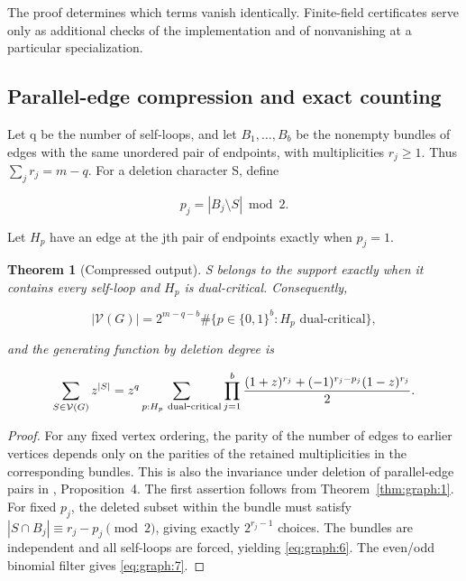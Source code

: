 \documentclass[11pt,a4paper,oneside]{article}
\theoremstyle{plain}
\newtheorem{theorem}{Theorem}[section]
\theoremstyle{definition}
\theoremstyle{remark}
\numberwithin{equation}{section}
\begin{document}
The proof determines which terms vanish identically. Finite-field certificates serve only as additional checks of the implementation and of nonvanishing at a particular specialization.


\subsection{Parallel-edge compression and exact counting}\label{sec:graph:3}

Let q be the number of self-loops, and let \(B_1,\ldots,B_b\) be the nonempty bundles of edges with the same unordered pair of endpoints, with multiplicities \(r_j\ge1\). Thus \(\sum_jr_j=m-q\). For a deletion character S, define

\begin{equation}
p_j=|B_j\setminus S|\bmod2.
\end{equation}

Let \(H_p\) have an edge at the jth pair of endpoints exactly when \(p_j=1\).

\begin{theorem}[Compressed output]

\label{thm:graph:2} S belongs to the support exactly when it contains every self-loop and \(H_p\) is dual-critical. Consequently,

\begin{equation}
|\mathcal V(G)|=2^{m-q-b}
    \#\{p\in\{0,1\}^b:H_p\text{ dual-critical}\},             \label{eq:graph:6}
\end{equation}

and the generating function by deletion degree is

\begin{equation}
\sum_{S\in\mathcal V(G)}z^{|S|}
 =z^q\sum_{p:H_p\ {\rm dual\mbox{-}critical}}
   \prod_{j=1}^b
   \frac{(1+z)^{r_j}+(-1)^{r_j-p_j}(1-z)^{r_j}}2.           \label{eq:graph:7}
\end{equation}

\end{theorem}

\begin{proof}

For any fixed vertex ordering, the parity of the number of edges to earlier vertices depends only on the parities of the retained multiplicities in the corresponding bundles. This is also the invariance under deletion of parallel-edge pairs in \cite{dualcritical}, Proposition~4. The first assertion follows from Theorem~\ref{thm:graph:1}. For fixed \(p_j\), the deleted subset within the bundle must satisfy \(|S\cap B_j|\equiv r_j-p_j\pmod2\), giving exactly \(2^{r_j-1}\) choices. The bundles are independent and all self-loops are forced, yielding \eqref{eq:graph:6}. The even/odd binomial filter gives \eqref{eq:graph:7}.

\end{proof}
\end{document}
